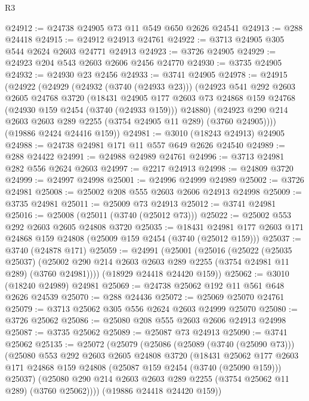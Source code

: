\begin{lexlean}{R3}
\begin{coremodule}
@24912 := @24738 @24905 @73 @11 @549 @650 @2626 @24541
@24913 := @288 @24418
@24915 := @24912 @24913 @24761
@24922 := @3713 @24905 @305 @544 @2624 @2603 @24771 @24913
@24923 := @3726 @24905
@24929 := @24923 @204 @543 @2603 @2606 @2456 @24770
@24930 := @3735 @24905
@24932 := @24930 @23 @2456
@24933 := @3741 @24905
@24978 := @24915
    (@24922
      (@24929
        (@24932 (@3740 (@24933 @23)))
        (@24923
          @541
          @292
          @2603
          @2605
          @24768
          @3720
          (@18431
            @24905
            @177
            @2603
            @73
            @24868
            @159
            @24768
            (@24930 @159 @2454 (@3740 (@24933 @159)))
            @24880)
          (@24923 @290 @214 @2603 @2603 @289 @2255 (@3754 @24905 @11 @289) (@3760 @24905))))
      (@19886 @2424 @24416 @159))
@24981 := @3010 (@18243 @24913) @24905
@24988 := @24738 @24981 @171 @11 @557 @649 @2626 @24540
@24989 := @288 @24422
@24991 := @24988 @24989 @24761
@24996 := @3713 @24981 @282 @556 @2624 @2603
@24997 := @2217 @24913
@24998 := @24809 @3720
@24999 := @24997 @24998
@25001 := @24996 @24999 @24989
@25002 := @3726 @24981
@25008 := @25002 @208 @555 @2603 @2606 @24913 @24998
@25009 := @3735 @24981
@25011 := @25009 @73 @24913
@25012 := @3741 @24981
@25016 := @25008 (@25011 (@3740 (@25012 @73)))
@25022 := @25002 @553 @292 @2603 @2605 @24808 @3720
@25035 := @18431 @24981 @177 @2603 @171 @24868 @159 @24808 (@25009 @159 @2454 (@3740 (@25012 @159)))
@25037 := @3740 (@24878 @171)
@25059 := @24991
    (@25001
      (@25016
        (@25022
          (@25035 @25037)
          (@25002 @290 @214 @2603 @2603 @289 @2255 (@3754 @24981 @11 @289) (@3760 @24981))))
      (@18929 @24418 @24420 @159))
@25062 := @3010 (@18240 @24989) @24981
@25069 := @24738 @25062 @192 @11 @561 @648 @2626 @24539
@25070 := @288 @24436
@25072 := @25069 @25070 @24761
@25079 := @3713 @25062 @305 @556 @2624 @2603 @24999 @25070
@25080 := @3726 @25062
@25086 := @25080 @208 @555 @2603 @2606 @24913 @24998
@25087 := @3735 @25062
@25089 := @25087 @73 @24913
@25090 := @3741 @25062
@25135 := @25072
    (@25079
      (@25086
        (@25089 (@3740 (@25090 @73)))
        (@25080
          @553
          @292
          @2603
          @2605
          @24808
          @3720
          (@18431
            @25062
            @177
            @2603
            @171
            @24868
            @159
            @24808
            (@25087 @159 @2454 (@3740 (@25090 @159)))
            @25037)
          (@25080 @290 @214 @2603 @2603 @289 @2255 (@3754 @25062 @11 @289) (@3760 @25062))))
      (@19886 @24418 @24420 @159))

\end{coremodule}
\end{lexlean}
